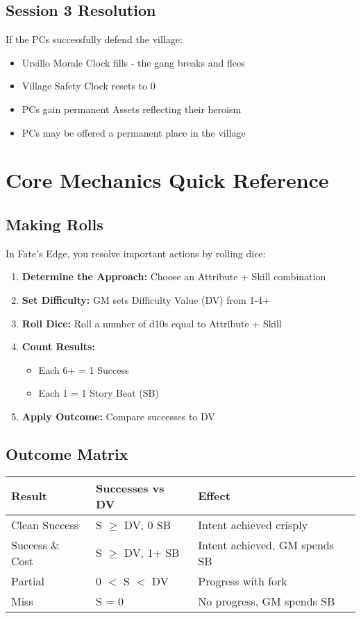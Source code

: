 \documentclass[11pt]{article}
\begin{document}
\subsection{Session 3 Resolution}

If the PCs successfully defend the village:
\begin{itemize}
\item Ursillo Morale Clock fills - the gang breaks and flees
\item Village Safety Clock resets to 0
\item PCs gain permanent Assets reflecting their heroism
\item PCs may be offered a permanent place in the village
\end{itemize}

\section{Core Mechanics Quick Reference}

\subsection{Making Rolls}

In Fate's Edge, you resolve important actions by rolling dice:
\begin{enumerate}
\item \textbf{Determine the Approach:} Choose an Attribute + Skill combination
\item \textbf{Set Difficulty:} GM sets Difficulty Value (DV) from 1-4+
\item \textbf{Roll Dice:} Roll a number of d10s equal to Attribute + Skill
\item \textbf{Count Results:}
   \begin{itemize}
   \item Each 6+ = 1 Success
   \item Each 1 = 1 Story Beat (SB)
   \end{itemize}
\item \textbf{Apply Outcome:} Compare successes to DV
\end{enumerate}

\subsection{Outcome Matrix}

\begin{center}
\begin{tabular}{|l|l|l|}
\hline
\textbf{Result} & \textbf{Successes vs DV} & \textbf{Effect} \\
\hline
Clean Success & S $\geq$ DV, 0 SB & Intent achieved crisply \\
Success \& Cost & S $\geq$ DV, 1+ SB & Intent achieved, GM spends SB \\
Partial & 0 $<$ S $<$ DV & Progress with fork \\
Miss & S = 0 & No progress, GM spends SB \\
\hline
\end{tabular}
\end{center}
\end{document}

